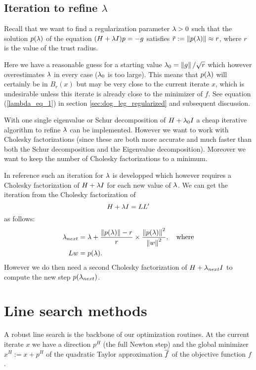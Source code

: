 \subsection{Iteration to refine $\lambda$}
\label{sec:lambda_iter}

Recall that we want to find a regularization parameter $\lambda>0$ such that the solution $p(\lambda)$ of the equation
$(H+\lambda I)p=-g$ satisfies $\tilde r:=\left\|p(\lambda)\right\|\approx r$, where $r$ is the value of the trust radius.

Here we have a reasonable guess for a starting value $\lambda_0=\left\|g\right\|/\sqrt r$ which however overestimates $\lambda$
in every case ($\lambda_0$ is too large). This means that $p(\lambda)$ will certainly be in $B_r(x)$ but may be very close to the current
iterate $x$, which is undesirable unless this iterate is already close to the minimizer of $f$.
See equation (\ref{lambda_eq_1}) in section \ref{sec:dog_leg_regularized} and subsequent discussion.

With one single eigenvalue or Schur decomposition of $H+\lambda_0 I$ a cheap iterative algorithm to refine $\lambda$
can be implemented. However we want to work with Cholesky factorizations (since these are both more accurate 
and much faster than both the Schur decomposition and the Eigenvalue decomposition). Moreover we want to keep the 
number of Cholesky factorizations to a minimum.

In reference \cite{NG} such an iteration for $\lambda$ is developped which however requires a Cholesky factorization of
$H+\lambda I$ for each new value of $\lambda$. We can get the iteration from the Cholesky factorization of 
$$
H+\lambda I=LL'
$$
as follows:
%
\begin{align}
\label{lambda_iter} 
\lambda_{next} &= \lambda+\frac{\left\|p(\lambda)\right\|-r}{r}\times\frac{\left\|p(\lambda)\right\|^2}{\left\|w\right\|^2},\quad\text{where}\\\notag
Lw &= p(\lambda).
\end{align}
%
However we do then need a second Cholesky factorization of $H+\lambda_{next}I$ to compute the new step $p(\lambda_{next})$.





\section{Line search methods}
\label{sec:line_search}

A robust line search is the backbone of our optimization routines. At the current iterate $x$ we have a direction $p^H$ 
(the full Newton step) and the global minimizer $x^H:=x+p^H$ of the quadratic Taylor approximation  $\overline f$ of the objective 
function $f$. 

